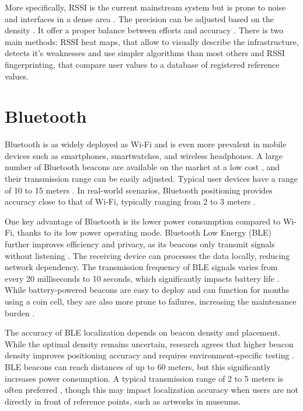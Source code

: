 More specifically, RSSI is the current mainstream system but is prone to noise and interfaces in a dense area \cite{spachos_ble_2020}. The precision can be adjusted based on the density \cite{shang_overview_2022}. It offer a proper balance between efforts and accuracy \cite{ali_locali_2017}. There is two main methods:
 RSSI heat maps, that allow to visually describe the infrastructure, detects it's weaknesses and use simpler algorithms than most others \cite{ali_locali_2017} and RSSI fingerprinting, that compare user values to a database of registered reference values. 

\section{Bluetooth}

Bluetooth is as widely deployed as Wi-Fi and is even more prevalent in mobile devices such as smartphones, smartwatches, and wireless headphones. A large number of Bluetooth beacons are available on the market at a low cost \cite{spachos_ble_2020}, and their transmission range can be easily adjusted. Typical user devices have a range of 10 to 15 meters \cite{mainetti_survey_2014}. In real-world scenarios, Bluetooth positioning provides accuracy close to that of Wi-Fi, typically ranging from 2 to 3 meters \cite{mainetti_survey_2014} \cite{spachos_ble_2020}.   

One key advantage of Bluetooth is its lower power consumption compared to Wi-Fi, thanks to its low power  operating mode. Bluetooth Low Energy (BLE) further improves efficiency and privacy, as its beacons only transmit signals without listening \cite{spachos_ble_2020}. The receiving device can processes the data locally, reducing network dependency. The transmission frequency of BLE signals varies from every 20 milliseconds to 10 seconds, which significantly impacts battery life \cite{spachos_ble_2020}. While battery-powered beacons are easy to deploy and can function for months using a coin cell, they are also more prone to failures, increasing the maintenance burden \cite{spachos_ble_2020}.   

The accuracy of BLE localization depends on beacon density and placement. While the optimal density remains uncertain, research agrees that higher beacon density improves positioning accuracy and requires environment-specific testing \cite{spachos_ble_2020} \cite{shang_overview_2022}. BLE beacons can reach distances of up to 60 meters, but this significantly increases power consumption. A typical transmission range of 2 to 5 meters is often preferred \cite{spachos_ble_2020}, though this may impact localization accuracy when users are not directly in front of reference points, such as artworks in museums.   

